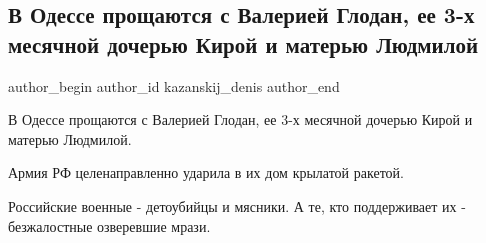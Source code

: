  
 
 
 
 
 
\subsection{В Одессе прощаются с Валерией Глодан, ее 3-х месячной дочерью Кирой и матерью Людмилой}
\label{sec:27_04_2022.tg.kazanskij_denis.1.odessa_proschanie}
 
\ifcmt
 author_begin
   author_id kazanskij_denis
 author_end
\fi


В Одессе прощаются с Валерией Глодан, ее 3-х месячной дочерью Кирой и матерью
Людмилой. 

Армия РФ целенаправленно ударила в их дом крылатой ракетой. 

Российские военные - детоубийцы и мясники. А те, кто поддерживает их -
безжалостные озверевшие мрази.
